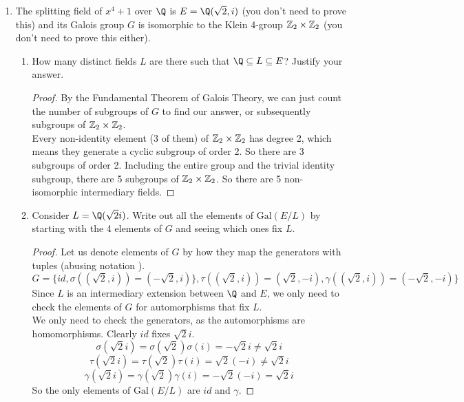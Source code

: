 \documentclass[12pt]{article}
\begin{document}
\begin{enumerate}
		\item The splitting field of $x^4 + 1$ over $\Q$ is $E=\Q(\sqrt{2}, i)$ (you don’t need to prove this) and its Galois group $G$ is isomorphic to the Klein 4-group $\mathbb{Z}_2 \times \mathbb{Z}_2$ (you don’t need to prove this either).
		\begin{enumerate}
			\item How many distinct fields $L$ are there such that $\Q \subseteq L \subseteq E$? Justify your answer.
			\begin{proof}
				By the Fundamental Theorem of Galois Theory, we can just count the number of subgroups of $G$ to find our answer, or subsequently subgroups of $\mathbb{Z}_2 \times \mathbb{Z}_2$.\\
				Every non-identity element (3 of them) of $\mathbb{Z}_2 \times \mathbb{Z}_2$ has degree 2, which means they generate a cyclic subgroup of order 2. So there are 3 subgroups of order 2. Including the entire group and the trivial identity subgroup, there are 5 subgroups of $\mathbb{Z}_2 \times \mathbb{Z}_2$. So there are 5 non-isomorphic intermediary fields.
			\end{proof}
			\item Consider $L = \Q(\sqrt{2}i)$. Write out all the elements of $\text{Gal}(E/L)$ by starting with the 4 elements of $G$ and seeing which ones fix $L$.
			\begin{proof}
				Let us denote elements of $G$ by how they map the generators with tuples (abusing notation \Smiley ). \[G = \{id, \sigma((\sqrt{2},i)) = (-\sqrt{2},i)\}, \tau((\sqrt{2},i)) = (\sqrt{2},-i), \gamma((\sqrt{2},i)) = (-\sqrt{2},-i)\}\]
				Since $L$ is an intermediary extension between $\Q$ and $E$, we only need to check the elements of $G$ for automorphisms that fix $L$.\\
				We only need to check the generators, as the automorphisms are homomorphisms. Clearly $id$ fixes $\sqrt{2}i$.
				\[\sigma(\sqrt{2}i) = \sigma(\sqrt{2})\sigma(i) = -\sqrt{2}i \neq \sqrt{2}i\]
				\[\tau(\sqrt{2}i) = \tau(\sqrt{2})\tau(i) = \sqrt{2}(-i) \neq \sqrt{2}i\]
				\[\gamma(\sqrt{2}i) = \gamma(\sqrt{2})\gamma(i) = -\sqrt{2}(-i) = \sqrt{2}i\]
				So the only elements of $\text{Gal}(E/L)$ are $id$ and $\gamma$.
			\end{proof}
		\end{enumerate}
	\end{enumerate}
\end{document}

